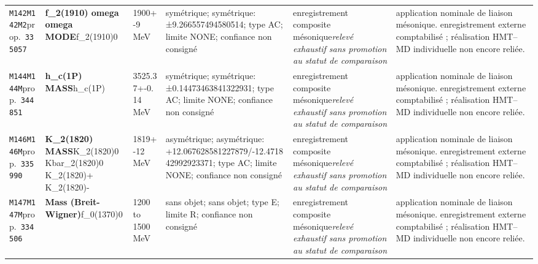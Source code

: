 \begin{landscape}
\begin{longtable}{L{1.85cm}L{4.45cm}L{2.35cm}L{4.05cm}L{3.35cm}L{7.15cm}}
\texttt{M142}\newline \texttt{M142M2}\newline prop.\ \texttt{335057} & \textbf{f\_\allowbreak{}2(1910) omega omega MODE}\newline f\_\allowbreak{}2(1910)0 & 1900+-9\,MeV & symétrique; symétrique: ±9.266557494580514; type AC; limite NONE; confiance non consigné & enregistrement composite mésonique\newline \emph{relevé exhaustif sans promotion au statut de comparaison} & application nominale de liaison mésonique. enregistrement externe comptabilisé ; réalisation HMT--MD individuelle non encore reliée. \\
\texttt{M144}\newline \texttt{M144M}\newline prop.\ \texttt{344851} & \textbf{h\_\allowbreak{}c(1P) MASS}\newline h\_\allowbreak{}c(1P) & 3525.37+-0.14\,MeV & symétrique; symétrique: ±0.14473463841322931; type AC; limite NONE; confiance non consigné & enregistrement composite mésonique\newline \emph{relevé exhaustif sans promotion au statut de comparaison} & application nominale de liaison mésonique. enregistrement externe comptabilisé ; réalisation HMT--MD individuelle non encore reliée. \\
\texttt{M146}\newline \texttt{M146M}\newline prop.\ \texttt{335990} & \textbf{K\_\allowbreak{}2(1820) MASS}\newline K\_\allowbreak{}2(1820)0 \textbar{}\allowbreak{} Kbar\_\allowbreak{}2(1820)0 \textbar{}\allowbreak{} K\_\allowbreak{}2(1820)+ \textbar{}\allowbreak{} K\_\allowbreak{}2(1820)- & 1819+-12\,MeV & asymétrique; asymétrique: +12.067628581227879/-12.471842992923371; type AC; limite NONE; confiance non consigné & enregistrement composite mésonique\newline \emph{relevé exhaustif sans promotion au statut de comparaison} & application nominale de liaison mésonique. enregistrement externe comptabilisé ; réalisation HMT--MD individuelle non encore reliée. \\
\texttt{M147}\newline \texttt{M147M}\newline prop.\ \texttt{334506} & \textbf{Mass (Breit-Wigner)}\newline f\_\allowbreak{}0(1370)0 & 1200 to 1500\,MeV & sans objet; sans objet; type E; limite R; confiance non consigné & enregistrement composite mésonique\newline \emph{relevé exhaustif sans promotion au statut de comparaison} & application nominale de liaison mésonique. enregistrement externe comptabilisé ; réalisation HMT--MD individuelle non encore reliée. \\

\end{longtable}
\end{landscape}
